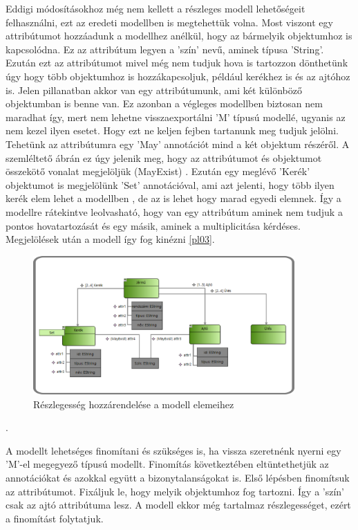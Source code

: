 \par
Eddigi módosításokhoz még nem kellett a részleges modell lehetőségeit felhasználni, ezt az eredeti modellben is megtehettük volna. Most viszont egy attribútumot hozzáadunk a modellhez anélkül, hogy az bármelyik objektumhoz is kapcsolódna. Ez az attribútum legyen a 'szín' nevű, aminek típusa 'String'. Ezután ezt az attribútumot mivel még nem tudjuk  hova is tartozzon dönthetünk úgy hogy több objektumhoz is hozzákapcsoljuk, például kerékhez is és az ajtóhoz is.
Jelen pillanatban akkor van egy attribútumunk, ami két különböző objektumban is benne van. Ez azonban a végleges modellben biztosan nem maradhat így, mert nem lehetne visszaexportálni 'M' típusú modellé, ugyanis az nem kezel ilyen esetet. Hogy ezt ne keljen fejben tartanunk meg tudjuk jelölni. Tehetünk az attribútumra egy 'May' annotációt mind a két objektum részéről. A szemléltető ábrán ez úgy jelenik meg, hogy az attribútumot és objektumot összekötő vonalat megjelöljük (MayExist) . Ezután egy meglévő 'Kerék' objektumot is megjelölünk 'Set' annotációval, ami azt jelenti, hogy több ilyen kerék elem lehet a modellben , de az is lehet hogy marad egyedi elemnek. Így a modellre rátekintve leolvasható, hogy van egy attribútum aminek nem tudjuk a pontos hovatartozását és egy másik, aminek a multiplicitása kérdéses. Megjelölések után a modell így fog kinézni \autoref{pl03}.
\begin{figure}[!ht]
	\centering
	\includegraphics[width=100mm]{figures/pl03.pdf}
	\caption{Részlegesség hozzárendelése a modell elemeihez} 
	\label{pl03}
\end{figure}.
\par
A modellt lehetséges finomítani és szükséges is, ha vissza szeretnénk nyerni egy 'M'-el megegyező típusú modellt. Finomítás következtében eltüntethetjük az annotációkat és azokkal együtt a bizonytalanságokat is. Első lépésben finomítsuk az attribútumot. Fixáljuk le, hogy melyik objektumhoz fog tartozni. Így a 'szín' csak az ajtó attribútuma lesz. A modell ekkor még tartalmaz részlegességet, ezért a finomítást folytatjuk.
